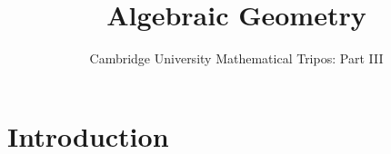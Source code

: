 \documentclass{article}
\title{Algebraic Geometry}
\author{Cambridge University Mathematical Tripos: Part III}
\begin{document}
\maketitle

\tableofcontentsnewpage{}

\section{Introduction}

\end{document}
